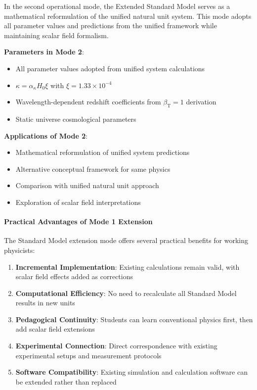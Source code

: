 \documentclass[12pt,a4paper]{article}
\newcommand{\betaT}{\beta_{\text{T}}}
\newcommand{\xipar}{\xi}
\begin{document}
	In the second operational mode, the Extended Standard Model serves as a mathematical reformulation of the unified natural unit system. This mode adopts all parameter values and predictions from the unified framework while maintaining scalar field formalism.
	
	\textbf{Parameters in Mode 2}:
	\begin{itemize}
		\item All parameter values adopted from unified system calculations
		\item $\kappa = \alpha_\kappa H_0 \xipar$ with $\xipar = 1.33 \times 10^{-4}$
		\item Wavelength-dependent redshift coefficients from $\betaT = 1$ derivation
		\item Static universe cosmological parameters
	\end{itemize}
	
	\textbf{Applications of Mode 2}:
	\begin{itemize}
		\item Mathematical reformulation of unified system predictions
		\item Alternative conceptual framework for same physics
		\item Comparison with unified natural unit approach
		\item Exploration of scalar field interpretations
	\end{itemize}
	
	\paragraph{Practical Advantages of Mode 1 Extension}
	\label{par:practical_advantages_mode1}
	
	The Standard Model extension mode offers several practical benefits for working physicists:
	
	\begin{enumerate}
		\item \textbf{Incremental Implementation}: Existing calculations remain valid, with scalar field effects added as corrections
		\item \textbf{Computational Efficiency}: No need to recalculate all Standard Model results in new units
		\item \textbf{Pedagogical Continuity}: Students can learn conventional physics first, then add scalar field extensions
		\item \textbf{Experimental Connection}: Direct correspondence with existing experimental setups and measurement protocols
		\item \textbf{Software Compatibility}: Existing simulation and calculation software can be extended rather than replaced
	\end{enumerate}
	
\end{document}
